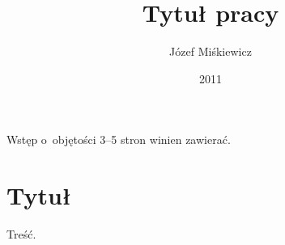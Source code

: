 \documentclass[brudnopis,xodstep]{wkmgr}
\author{Józef Miśkiewicz}
\title{Tytuł pracy}
\date{2011}
\begin{document}
\maketitle
\introduction
Wstęp o~objętości 3--5 stron winien zawierać.
\chapter{Tytuł}
Treść.
\end{document}
